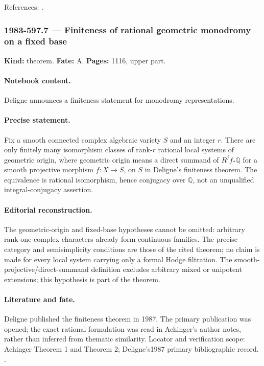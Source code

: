\noindent References: \citep{delignemostow1986monodromy}.\par

\subsubsection{1983-597.7 --- Finiteness of rational geometric monodromy on a fixed base}

\label{item:1983-597.7}

\noindent\textbf{Kind:} theorem. \textbf{Fate:} A. \textbf{Pages:} 1116, upper part.\par

\paragraph{Notebook content.} Deligne announces a finiteness statement for monodromy representations.

\paragraph{Precise statement.} Fix a smooth connected complex algebraic variety \(S\) and an integer \(r\). There are only finitely many isomorphism classes of rank-\(r\) rational local systems of geometric origin, where geometric origin means a direct summand of \(R^jf_*\mathbb Q\) for a smooth projective morphism \(f:X\to S\), on \(S\) in Deligne's finiteness theorem. The equivalence is rational isomorphism, hence conjugacy over \(\mathbb Q\), not an unqualified integral-conjugacy assertion.

\paragraph{Editorial reconstruction.} The geometric-origin and fixed-base hypotheses cannot be omitted: arbitrary rank-one complex characters already form continuous families. The precise category and semisimplicity conditions are those of the cited theorem; no claim is made for every local system carrying only a formal Hodge filtration. The smooth-projective/direct-summand definition excludes arbitrary mixed or unipotent extensions; this hypothesis is part of the theorem.

\paragraph{Literature and fate.} Deligne published the finiteness theorem in 1987. The primary publication was opened; the exact rational formulation was read in Achinger's author notes, rather than inferred from thematic similarity. Locator and verification scope: Achinger Theorem 1 and Theorem 2; Deligne's1987 primary bibliographic record. \cite{deligne1987finitude,achinger2018monodromy}.

